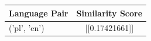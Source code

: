 \begin{tabular}{|l|c|}
\hline
Language Pair & Similarity Score \\
\hline
('pl', 'en') & [[0.17421661]] \\
\hline
\end{tabular}

